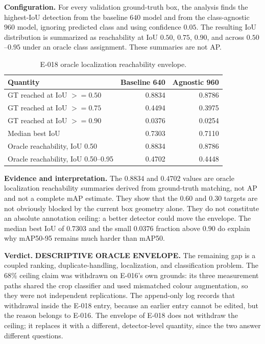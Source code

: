 \documentclass[preprint,12pt]{elsarticle}
\begin{document}
\textbf{Configuration.} For every validation ground-truth box, the analysis
finds the highest-IoU detection from the baseline \(640\) model and from the
class-agnostic \(960\) model, ignoring predicted class and using confidence
\(0.05\). The resulting IoU distribution is summarized as reachability at
IoU \(0.50\), \(0.75\), \(0.90\), and across \(0.50\)--\(0.95\) under an
oracle class assignment. These summaries are not AP.

\begin{table}[H]
\centering
\caption{E-018 oracle localization reachability envelope.}
\label{tab:e018}
\begin{tabular}{lrr}
\toprule
Quantity & Baseline 640 & Agnostic 960\\
\midrule
GT reached at IoU \(>=0.50\) & 0.8834 & 0.8786\\
GT reached at IoU \(>=0.75\) & 0.4494 & 0.3975\\
GT reached at IoU \(>=0.90\) & 0.0376 & 0.0254\\
Median best IoU & 0.7303 & 0.7110\\
Oracle reachability, IoU 0.50 & 0.8834 & 0.8786\\
Oracle reachability, IoU 0.50--0.95 & 0.4702 & 0.4448\\
\bottomrule
\end{tabular}
\end{table}

\textbf{Evidence and interpretation.} The \(0.8834\) and \(0.4702\) values
are oracle localization reachability summaries derived from ground-truth
matching, not AP and not a complete mAP estimate. They show that the \(0.60\)
and \(0.30\) targets are not obviously blocked by the current box geometry
alone. They do not constitute an absolute annotation ceiling:
a better detector could move the envelope. The median best IoU of \(0.7303\)
and the small \(0.0376\) fraction above \(0.90\) do explain why
mAP50-95 remains much harder than mAP50.

\textbf{Verdict.} \textbf{DESCRIPTIVE ORACLE ENVELOPE.} The remaining gap is a
coupled ranking, duplicate-handling, localization, and classification
problem. The \(68\%\) ceiling claim was withdrawn on E-016's own grounds: its
three measurement paths shared the crop classifier and used mismatched colour
augmentation, so they were not independent replications. The append-only log
records that withdrawal inside the E-018 entry, because an earlier entry
cannot be edited, but the reason belongs to E-016. The envelope of E-018 does
not withdraw the ceiling; it replaces it with a different, detector-level
quantity, since the two answer different questions.
\end{document}
